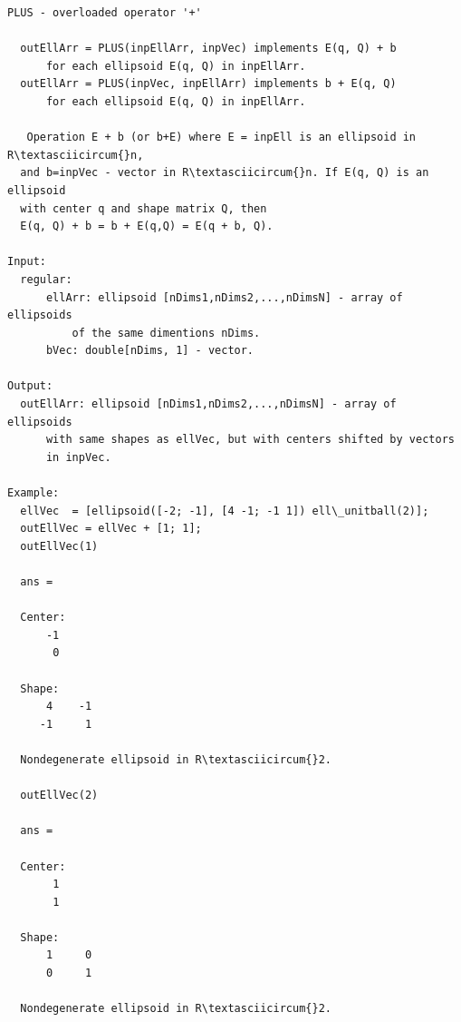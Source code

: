 \documentclass[letterpaper,10pt,english]{sphinxmanual}
\begin{document}
\begin{Verbatim}[commandchars=\\\{\}]
PLUS - overloaded operator '+'

  outEllArr = PLUS(inpEllArr, inpVec) implements E(q, Q) + b
      for each ellipsoid E(q, Q) in inpEllArr.
  outEllArr = PLUS(inpVec, inpEllArr) implements b + E(q, Q)
      for each ellipsoid E(q, Q) in inpEllArr.

   Operation E + b (or b+E) where E = inpEll is an ellipsoid in R\textasciicircum{}n,
  and b=inpVec - vector in R\textasciicircum{}n. If E(q, Q) is an ellipsoid
  with center q and shape matrix Q, then
  E(q, Q) + b = b + E(q,Q) = E(q + b, Q).

Input:
  regular:
      ellArr: ellipsoid [nDims1,nDims2,...,nDimsN] - array of ellipsoids
          of the same dimentions nDims.
      bVec: double[nDims, 1] - vector.

Output:
  outEllArr: ellipsoid [nDims1,nDims2,...,nDimsN] - array of ellipsoids
      with same shapes as ellVec, but with centers shifted by vectors
      in inpVec.

Example:
  ellVec  = [ellipsoid([-2; -1], [4 -1; -1 1]) ell\_unitball(2)];
  outEllVec = ellVec + [1; 1];
  outEllVec(1)

  ans =

  Center:
      -1
       0

  Shape:
      4    -1
     -1     1

  Nondegenerate ellipsoid in R\textasciicircum{}2.

  outEllVec(2)

  ans =

  Center:
       1
       1

  Shape:
      1     0
      0     1

  Nondegenerate ellipsoid in R\textasciicircum{}2.
\end{Verbatim}
\end{document}
